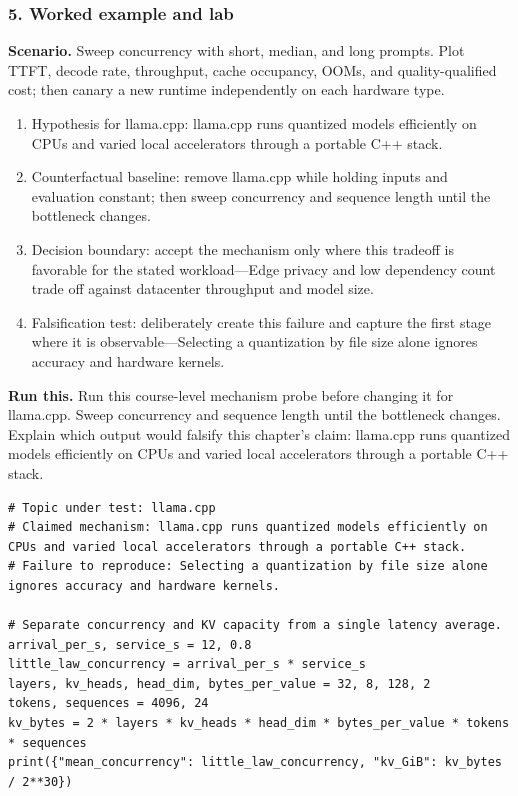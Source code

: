 \subsubsection*{5. Worked example and lab}
\textbf{Scenario.} Sweep concurrency with short, median, and long prompts. Plot TTFT, decode rate, throughput, cache occupancy, OOMs, and quality-qualified cost; then canary a new runtime independently on each hardware type.
\begin{enumerate}
\item Hypothesis for llama.cpp: llama.cpp runs quantized models efficiently on CPUs and varied local accelerators through a portable C++ stack.
\item Counterfactual baseline: remove llama.cpp while holding inputs and evaluation constant; then sweep concurrency and sequence length until the bottleneck changes.
\item Decision boundary: accept the mechanism only where this tradeoff is favorable for the stated workload—Edge privacy and low dependency count trade off against datacenter throughput and model size.
\item Falsification test: deliberately create this failure and capture the first stage where it is observable—Selecting a quantization by file size alone ignores accuracy and hardware kernels.
\end{enumerate}
\textbf{Run this.} Run this course-level mechanism probe before changing it for llama.cpp. Sweep concurrency and sequence length until the bottleneck changes. Explain which output would falsify this chapter's claim: llama.cpp runs quantized models efficiently on CPUs and varied local accelerators through a portable C++ stack.
\begin{Verbatim}[fontsize=\scriptsize]
# Topic under test: llama.cpp
# Claimed mechanism: llama.cpp runs quantized models efficiently on CPUs and varied local accelerators through a portable C++ stack.
# Failure to reproduce: Selecting a quantization by file size alone ignores accuracy and hardware kernels.

# Separate concurrency and KV capacity from a single latency average.
arrival_per_s, service_s = 12, 0.8
little_law_concurrency = arrival_per_s * service_s
layers, kv_heads, head_dim, bytes_per_value = 32, 8, 128, 2
tokens, sequences = 4096, 24
kv_bytes = 2 * layers * kv_heads * head_dim * bytes_per_value * tokens * sequences
print({"mean_concurrency": little_law_concurrency, "kv_GiB": kv_bytes / 2**30})
\end{Verbatim}
